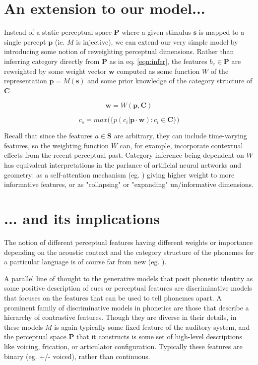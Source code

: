 \section{An extension to our model...}

Instead of a static perceptual space $\mathbf{P}$ where a given stimulus $\mathbf{s}$ is mapped to a single percept $\mathbf{p}$ (ie. $M$ is injective), we can extend our very simple model by introducing some notion of reweighting perceptual dimensions. Rather than inferring category directly from $\mathbf{P}$ as in eq. \ref{eqn:infer}, the features $b_e \in \mathbf{P}$ are reweighted by some weight vector $\mathbf{w}$ computed as some function $W$ of the representation $\mathbf{p} = M(\mathbf{s})$ and some prior knowledge of the category structure of $\mathbf{C}$

\begin{equation}
\label{eqn:w}
\mathbf{w} = W(\mathbf{p}, \mathbf{C})
\end{equation}

\begin{equation}
\label{eqn:infer_2}
c_s = max\big( \big\{ p(c_i | \mathbf{p} \cdot \mathbf{w}) : c_i \in \mathbf{C} \big\}\big)
\end{equation}

Recall that since the features $a \in \mathbf{S}$ are arbitrary, they can include time-varying features, so the weighting function $W$ can, for example, incorporate contextual effects from the recent perceptual past. Category inference being dependent on $W$ has equivalent interpretations in the parlance of artificial neural networks and geometry: as a self-attention mechanism (eg. \citep{vaswaniAttentionAllYou2017}) giving higher weight to more informative features, or as "collapsing" or "expanding" un/informative dimensions. 

\section{... and its implications}

The notion of different perceptual features having different weights or importance depending on the acoustic context and the category structure of the phonemes for a particular language is of course far from new (eg. \citep{schertzPhoneticCueWeighting2020}).

A parallel line of thought to the generative models that posit phonetic identity as some positive description of cues or perceptual features are discriminative models that focuses on the features that can be used to tell phonemes apart. A prominent family of discriminative models in phonetics are those that describe a hierarchy of contrastive features\citep{Dresher2008,clementsFeatureOrganization2006,halleFeatureSpreadingRepresentation2000}. Though they are diverse in their details, in these models $M$ is again typically some fixed feature of the auditory system, and the perceptual space $\mathbf{P}$ that it constructs is some set of high-level descriptions like voicing, frication, or articulator configuration. Typically these features are binary (eg. +/- voiced), rather than continuous.

